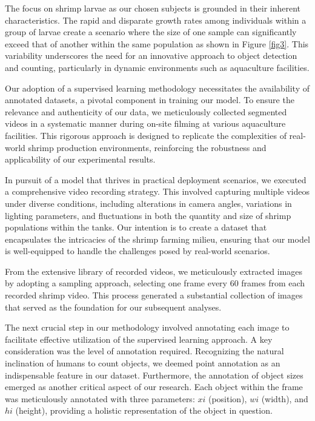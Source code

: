 \documentclass[journal]{IEEEtran}
\begin{document}
The focus on shrimp larvae as our chosen subjects is grounded in their inherent characteristics.  The rapid and disparate growth rates among individuals within a group of larvae create a scenario where the size of one sample can significantly exceed that of another within the same population as shown in Figure \ref*{fig3}. This variability underscores the need for an innovative approach to object detection and counting, particularly in dynamic environments such as aquaculture facilities.

Our adoption of a supervised learning methodology necessitates the availability of annotated datasets, a pivotal component in training our model. To ensure the relevance and authenticity of our data, we meticulously collected segmented videos in a systematic manner during on-site filming at various aquaculture facilities. This rigorous approach is designed to replicate the complexities of real-world shrimp production environments, reinforcing the robustness and applicability of our experimental results.

In pursuit of a model that thrives in practical deployment scenarios, we executed a comprehensive video recording strategy. This involved capturing multiple videos under diverse conditions, including alterations in camera angles, variations in lighting parameters, and fluctuations in both the quantity and size of shrimp populations within the tanks. Our intention is to create a dataset that encapsulates the intricacies of the shrimp farming milieu, ensuring that our model is well-equipped to handle the challenges posed by real-world scenarios.

From the extensive library of recorded videos, we meticulously extracted images by adopting a sampling approach, selecting one frame every 60 frames from each recorded shrimp video. This process generated a substantial collection of images that served as the foundation for our subsequent analyses.

The next crucial step in our methodology involved annotating each image to facilitate effective utilization of the supervised learning approach. A key consideration was the level of annotation required. Recognizing the natural inclination of humans to count objects, we deemed point annotation as an indispensable feature in our dataset. Furthermore, the annotation of object sizes emerged as another critical aspect of our research. Each object within the frame was meticulously annotated with three parameters: $xi$ (position), $wi$ (width), and $hi$ (height), providing a holistic representation of the object in question.
\end{document}
